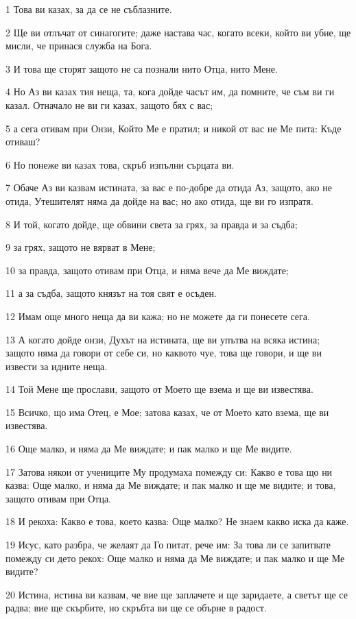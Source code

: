 \par 1 Това ви казах, за да се не съблазните.
\par 2 Ще ви отлъчат от синагогите; даже настава час, когато всеки, който ви убие, ще мисли, че принася служба на Бога.
\par 3 И това ще сторят защото не са познали нито Отца, нито Мене.
\par 4 Но Аз ви казах тия неща, та, кога дойде часът им, да помните, че съм ви ги казал. Отначало не ви ги казах, защото бях с вас;
\par 5 а сега отивам при Онзи, Който Ме е пратил; и никой от вас не Ме пита: Къде отиваш?
\par 6 Но понеже ви казах това, скръб изпълни сърцата ви.
\par 7 Обаче Аз ви казвам истината, за вас е по-добре да отида Аз, защото, ако не отида, Утешителят няма да дойде на вас; но ако отида, ще ви го изпратя.
\par 8 И той, когато дойде, ще обвини света за грях, за правда и за съдба;
\par 9 за грях, защото не вярват в Мене;
\par 10 за правда, защото отивам при Отца, и няма вече да Ме виждате;
\par 11 а за съдба, защото князът на тоя свят е осъден.
\par 12 Имам още много неща да ви кажа; но не можете да ги понесете сега.
\par 13 А когато дойде онзи, Духът на истината, ще ви упътва на всяка истина; защото няма да говори от себе си, но каквото чуе, това ще говори, и ще ви извести за идните неща.
\par 14 Той Мене ще прослави, защото от Моето ще взема и ще ви известява.
\par 15 Всичко, що има Отец, е Мое; затова казах, че от Моето като взема, ще ви известява.
\par 16 Още малко, и няма да Ме виждате; и пак малко и ще Ме видите.
\par 17 Затова някои от учениците Му продумаха помежду си: Какво е това що ни казва: Още малко, и няма да Ме виждате; и пак малко и ще ме видите; и това, защото отивам при Отца.
\par 18 И рекоха: Какво е това, което казва: Още малко? Не знаем какво иска да каже.
\par 19 Исус, като разбра, че желаят да Го питат, рече им: За това ли се запитвате помежду си дето рекох: Още малко и няма да Ме виждате; и пак малко и ще Ме видите?
\par 20 Истина, истина ви казвам, че вие ще заплачете и ще заридаете, а светът ще се радва; вие ще скърбите, но скръбта ви ще се обърне в радост.
